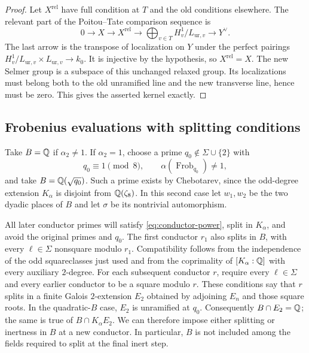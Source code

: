 \begin{proof}
Let $X^{\mathrm{rel}}$ have full condition at $T$ and the old
conditions elsewhere.  The relevant part of the Poitou--Tate comparison
sequence is
\[
 0\longrightarrow X\longrightarrow X^{\mathrm{rel}}
 \longrightarrow\bigoplus_{v\in T} H^1_v/L_{\mathrm{ur},v}
 \longrightarrow Y^\vee.
\]
The last arrow is the transpose of localization on $Y$ under the
perfect pairings
$H^1_v/L_{\mathrm{ur},v}\times L_{\mathrm{ur},v}\to k_0$.
It is injective by the hypothesis, so $X^{\mathrm{rel}}=X$.
The new Selmer group is a subspace of this unchanged relaxed group.
Its localizations must belong both to the old unramified line and the
new transverse line, hence must be zero.  This gives the asserted
kernel exactly.
\end{proof}

\subsection{Frobenius evaluations with splitting conditions}

Take $B=\mathbb Q$ if $\alpha_2\ne1$.  If $\alpha_2=1$, choose a prime
$q_0\notin\Sigma\cup\{2\}$ with
\[
           q_0\equiv1\pmod8,\qquad
           \alpha(\operatorname{Frob}_{q_0})\ne1,
\]
and take $B=\mathbb Q(\sqrt{q_0})$.  Such a prime exists by Chebotarev,
since the odd-degree extension $K_\alpha$ is disjoint from
$\mathbb Q(\zeta_8)$.  In this second case let $w_1,w_2$ be the two
dyadic places of $B$ and let $\sigma$ be its nontrivial automorphism.

All later conductor primes will satisfy \eqref{eq:conductor-power},
split in $K_\alpha$, and avoid the original primes and $q_0$.
The first conductor $r_1$ also splits in $B$, with every
$\ell\in\Sigma$ nonsquare modulo $r_1$.  Compatibility follows
from the independence of the odd squareclasses just used and from
the coprimality of $[K_\alpha:\mathbb Q]$ with every auxiliary $2$-degree.
For each subsequent conductor $r$, require every
$\ell\in\Sigma$ and every earlier conductor to be a square modulo
$r$.  These conditions say that $r$ splits in a finite Galois
$2$-extension $E_2$ obtained by adjoining $E_n$ and those square roots.
In the quadratic-$B$ case, $E_2$ is unramified at $q_0$.
Consequently $B\cap E_2=\mathbb Q$; the same is true of
$B\cap K_\alpha E_2$.  We can therefore impose either splitting or
inertness in $B$ at a new conductor.  In particular, $B$ is not included
among the fields required to split at the final inert step.

